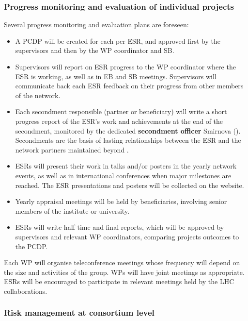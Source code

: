 \vspace{-2mm}

\subsubsection{Progress monitoring and evaluation of individual projects}
\label{sub:progressMonitoring}
 
Several progress monitoring and evaluation plans are foreseen:
\begin{itemize}%
\item A PCDP will be created for each  
per ESR, and approved first by the supervisors and then by the WP coordinator and SB.
\item Supervisors will report on ESR progress to the WP coordinator where the ESR is working, as well as in EB and SB meetings. Supervisors will communicate back each ESR
feedback on their progress from other members of the network. 
\item Each secondment responsible (partner or beneficiary) will write a short progress report of the ESR's work and achievements at the end of 
the secondment, monitored by the dedicated \textbf{secondment officer} Smirnova (\lundentity). Secondments are the basis of lasting relationships between the
ESR and the network partners maintained beyond \acronym. 
\item ESRs will present their work in talks and/or posters in the yearly network events, as well as in international conferences when
major milestones are reached. The ESR presentations and posters will be collected on the \acronym website. 
\item Yearly appraisal meetings will be held by beneficiaries, involving senior members of the institute or university.
\item ESRs will write half-time and final reports, which will be approved by supervisors and relevant WP coordinators, comparing projects outcomes to the PCDP. 
\end{itemize}
Each WP will organise teleconference meetings whose frequency will depend on the size
and activities of the group. WPs will have joint meetings as appropriate.
ESRs will be encouraged to participate in relevant meetings held by the LHC collaborations.
 
\vspace{-2mm}
\subsubsection{Risk management at consortium level}


